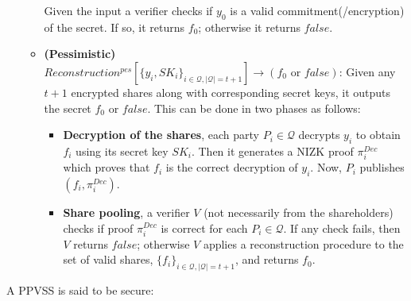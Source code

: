 \begin{definition}[PPVSS]
\begin{itemize}
\begin{itemize}
              Given the input a verifier checks if $y_0$ is a valid commitment(/encryption) of the secret. 
                 If so, it returns $f_0$; otherwise it returns $false$.
            \item \textbf{(Pessimistic)} $Reconstruction^{pes}[\{y_i,SK_i\}_{i\in\mathcal{Q},|\mathcal{Q}|=t+1}]\rightarrow(f_0\text{ or }false)$: 
              Given any $t+1$ encrypted shares along with corresponding secret keys, it outputs the secret 
              $f_0$ or $false$. This can be done in two phases as follows: 
                \begin{itemize}
                  \item \textbf{Decryption of the shares}, each party $P_i\in\mathcal{Q}$ decrypts $y_i$ to obtain 
                    $f_i$ using its secret key $SK_i$. Then it generates a NIZK proof $\pi_i^{Dec}$ which proves that 
                    $f_i$ is the correct decryption of $y_i$. Now, $P_i$ publishes $(f_i,\pi_i^{Dec})$.
                  \item \textbf{Share pooling}, a verifier $V$ (not necessarily from the shareholders) checks if proof 
                   $\pi_i^{Dec}$ is correct for each $P_i\in\mathcal{Q}$. If any check fails, then $V$ returns $false$; 
                   otherwise $V$ applies a reconstruction procedure to the set of valid shares, $\{f_i\}_{i\in\mathcal{Q},|\mathcal{Q}|=t+1}$, 
                   and returns $f_0$.
                \end{itemize}
          \end{itemize}
    \end{itemize}
\end{definition}

A PPVSS is said to be secure:

